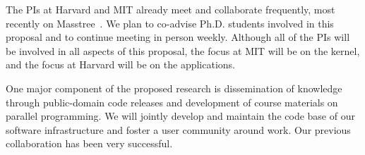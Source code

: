 The PIs at Harvard and MIT already meet and collaborate frequently,
most recently on Masstree~\cite{mao:masstree}.  We plan to co-advise
Ph.D. students involved in this proposal and to continue meeting in
person weekly.  Although all of the PIs will be involved in all aspects
of this proposal, the focus at MIT will be on the \sys kernel, and the
focus at Harvard will be on the applications.

One major component of the proposed research is dissemination of knowledge
through public-domain code releases and development of course materials on
parallel programming.  We will jointly develop and maintain the code base
of our software infrastructure and foster a user community around work.
Our previous collaboration has been very successful.

